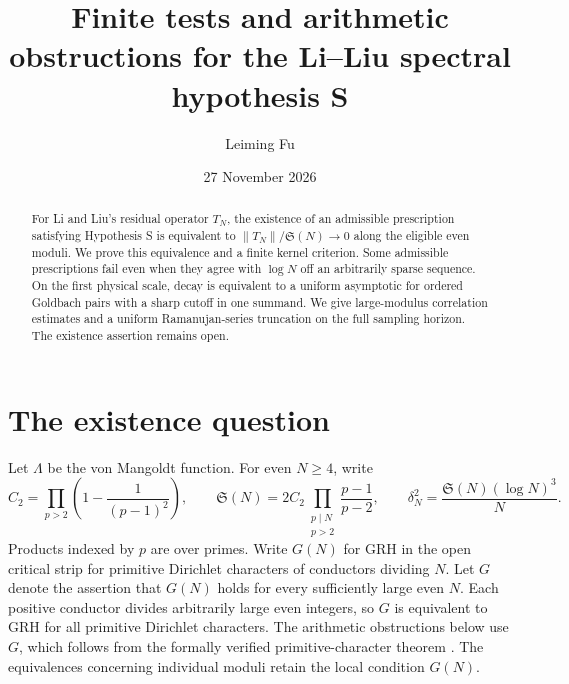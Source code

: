 \documentclass[11pt,a4paper]{article}
\title{Finite tests and arithmetic obstructions for the Li--Liu spectral hypothesis S}
\author{Leiming Fu}
\date{27 November 2026}
\newcommand{\SSg}{\mathfrak S}
\begin{document}
\maketitle
\begin{abstract}
For Li and Liu's residual operator $T_N$, the existence of an admissible prescription satisfying Hypothesis S is equivalent to $\|T_N\|/\mathfrak S(N)\to0$ along the eligible even moduli. We prove this equivalence and a finite kernel criterion. Some admissible prescriptions fail even when they agree with $\log N$ off an arbitrarily sparse sequence. On the first physical scale, decay is equivalent to a uniform asymptotic for ordered Goldbach pairs with a sharp cutoff in one summand. We give large-modulus correlation estimates and a uniform Ramanujan-series truncation on the full sampling horizon. The existence assertion remains open.
\end{abstract}

\section{The existence question}
Let $\Lambda$ be the von Mangoldt function. For even $N\ge4$, write
\[
 C_2=\prod_{p>2}\left(1-\frac{1}{(p-1)^2}\right),\qquad
 \SSg(N)=2C_2\prod_{\substack{p\mid N\\p>2}}\frac{p-1}{p-2},
 \qquad \delta_N^2=\frac{\SSg(N)(\log N)^3}{N}.
\]
Products indexed by $p$ are over primes. Write $G(N)$ for GRH in the open critical strip for primitive Dirichlet characters of conductors dividing $N$. Let $G$ denote the assertion that $G(N)$ holds for every sufficiently large even $N$. Each positive conductor divides arbitrarily large even integers, so $G$ is equivalent to GRH for all primitive Dirichlet characters. The arithmetic obstructions below use $G$, which follows from the formally verified primitive-character theorem \cite{grh,compact}. The equivalences concerning individual moduli retain the local condition $G(N)$.
\end{document}
